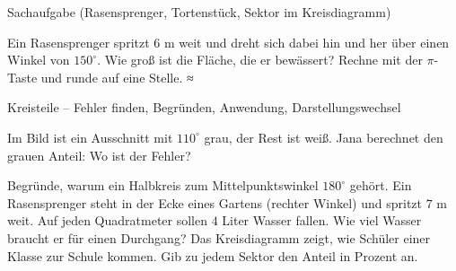 \begin{aufgabe}{Sachaufgabe (Rasensprenger, Tortenstück, Sektor im Kreisdiagramm)}
\begin{teile}
\teil Ein Rasensprenger spritzt $6$ m weit und dreht sich dabei hin und her über einen Winkel von $150^\circ$. Wie groß ist die Fläche, die er bewässert? Rechne mit der $\pi$-Taste und runde auf eine Stelle. ≈ \leerfeld[m²]
\end{teile}
\end{aufgabe}

\begin{aufgabe}{Kreisteile – Fehler finden, Begründen, Anwendung, Darstellungswechsel}
\begin{teile}
\teil Im Bild ist ein Ausschnitt mit $110^\circ$ grau, der Rest ist weiß. Jana berechnet den grauen Anteil:  Wo ist der Fehler?

\teil Begründe, warum ein Halbkreis zum Mittelpunktswinkel $180^\circ$ gehört.
\teil Ein Rasensprenger steht in der Ecke eines Gartens (rechter Winkel) und spritzt $7$ m weit. Auf jeden Quadratmeter sollen $4$ Liter Wasser fallen. Wie viel Wasser braucht er für einen Durchgang?
\teil Das Kreisdiagramm zeigt, wie Schüler einer Klasse zur Schule kommen. Gib zu jedem Sektor den Anteil in Prozent an.

\end{teile}
\end{aufgabe}
